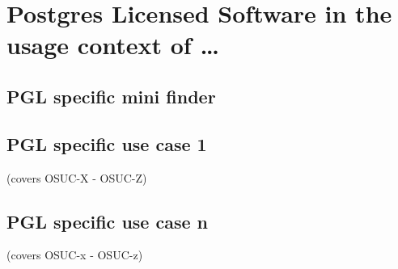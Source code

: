 %
%
%
%
%



\section{Postgres Licensed Software in the usage context of \ldots}

\label{OSUC-01-PGL} \label{OSUC-03-PGL} 
\label{OSUC-06-PGL} \label{OSUC-09-PGL}

\label{OSUC-02-PGL} \label{OSUC-04-PGL} \label{OSUC-05-PGL}
\label{OSUC-07-PGL} \label{OSUC-08-PGL} \label{OSUC-10-PGL}

\subsection{PGL specific mini finder}

\subsection{PGL specific use case 1}
(covers OSUC-X - OSUC-Z)

\subsection{PGL specific use case n}
(covers OSUC-x - OSUC-z)


%
